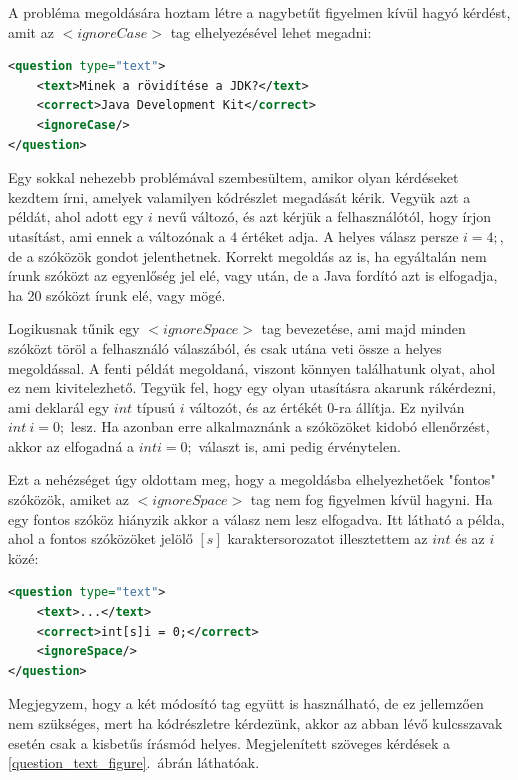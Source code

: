 \documentclass[12pt,a4paper]{article}
\begin{document}
	A probléma megoldására hoztam létre a nagybetűt figyelmen kívül hagyó kérdést, amit az $<ignoreCase>$ tag elhelyezésével lehet megadni:
	
	\begin{lstlisting}[language=XML]	
<question type="text">
	<text>Minek a rövidítése a JDK?</text>
	<correct>Java Development Kit</correct>
	<ignoreCase/>
</question>
	\end{lstlisting}
	
	\noindent
	Egy sokkal nehezebb problémával szembesültem, amikor olyan kérdéseket kezdtem írni, amelyek valamilyen kódrészlet megadását kérik. Vegyük azt a példát, ahol adott egy $i$ nevű változó, és azt kérjük a felhasználótól, hogy írjon utasítást, ami ennek a változónak a $4$ értéket adja. A helyes válasz persze $i = 4;$, de a szóközök gondot jelenthetnek. Korrekt megoldás az is, ha egyáltalán nem írunk szóközt az egyenlőség jel elé, vagy után, de a Java fordító azt is elfogadja, ha 20 szóközt írunk elé, vagy mögé.
	
	Logikusnak tűnik egy $<ignoreSpace>$ tag bevezetése, ami majd minden szóközt töröl a felhasználó válaszából, és csak utána veti össze a helyes megoldással. A fenti példát megoldaná, viszont könnyen találhatunk olyat, ahol ez nem kivitelezhető. Tegyük fel, hogy egy olyan utasításra akarunk rákérdezni, ami deklarál egy $int$ típusú $i$ változót, és az értékét $0$-ra állítja. Ez nyilván $int \ i = 0;$ lesz. Ha azonban erre alkalmaznánk a szóközöket kidobó ellenőrzést, akkor az elfogadná a $inti=0;$ választ is, ami pedig érvénytelen.
	
	Ezt a nehézséget úgy oldottam meg, hogy a megoldásba elhelyezhetőek "fontos" szóközök, amiket az $<ignoreSpace>$ tag nem fog figyelmen kívül hagyni. Ha egy fontos szóköz hiányzik akkor a válasz nem lesz elfogadva. Itt látható a példa, ahol a fontos szóközöket jelölő $[s]$ karaktersorozatot illesztettem az $int$ és az $i$ közé:
	
	\begin{lstlisting}[language=XML]	
<question type="text">
	<text>...</text>
	<correct>int[s]i = 0;</correct>
	<ignoreSpace/>
</question>
	\end{lstlisting}
	
	\noindent
	Megjegyzem, hogy a két módosító tag együtt is használható, de ez jellemzően nem szükséges, mert ha kódrészletre kérdezünk, akkor az abban lévő kulcsszavak esetén csak a kisbetűs írásmód helyes. Megjelenített szöveges kérdések a \ref{question_text_figure}.\ ábrán láthatóak.
	
\end{document}
